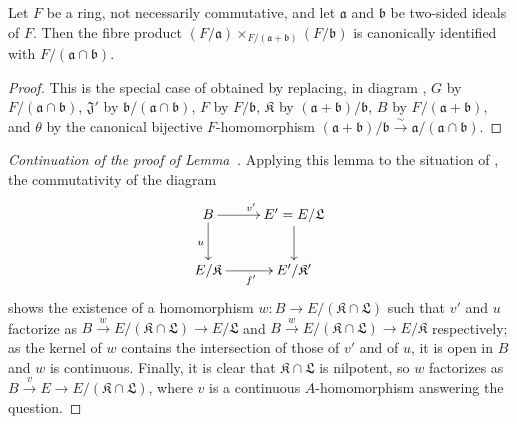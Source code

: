 \begin{lemma}[19.3.10.2]
\label{0.19.3.10.2}
Let $F$ be a ring, not necessarily commutative, and let $\mathfrak{a}$ and $\mathfrak{b}$ be two-sided ideals of $F$.
Then the fibre product $(F/\mathfrak{a})\times_{F/(\mathfrak{a}+\mathfrak{b})}(F/\mathfrak{b})$
is canonically identified with $F/(\mathfrak{a}\cap\mathfrak{b})$.
\end{lemma}

\begin{proof}
This is the special case of  obtained by replacing, in diagram , $G$ by $F/(\mathfrak{a}\cap\mathfrak{b})$, $\mathfrak{J}'$ by $\mathfrak{b}/(\mathfrak{a}\cap\mathfrak{b})$, $F$ by $F/\mathfrak{b}$, $\mathfrak K$ by $(\mathfrak{a}+\mathfrak{b})/\mathfrak{b}$, $B$ by $F/(\mathfrak{a}+\mathfrak{b})$, and $\theta$ by the canonical bijective $F$-homomorphism $(\mathfrak{a}+\mathfrak{b})/\mathfrak{b}\xrightarrow{\sim}\mathfrak{a}/(\mathfrak{a}\cap\mathfrak{b})$.
\end{proof}


\begin{proof}[Continuation of the proof of Lemma~{\rm{}}]
Applying this lemma to the situation of , the commutativity of the diagram
\[
\xymatrix{
  B \ar[r]^{v'} \ar[d]_u & E'=E/\mathfrak{L} \ar[d] \\
  E/\mathfrak K \ar[r]_{f'} & E'/\mathfrak K'
}
\]
shows the existence of a homomorphism $w:B\to E/(\mathfrak K\cap\mathfrak{L})$ such that $v'$ and $u$ factorize as
$B\xrightarrow{w}E/(\mathfrak K\cap\mathfrak{L})\to E/\mathfrak{L}$
and
$B\xrightarrow{w}E/(\mathfrak K\cap\mathfrak{L})\to E/\mathfrak K$
respectively; as the kernel of $w$ contains the intersection of those of $v'$ and of $u$, it is open in $B$ and $w$ is continuous.
Finally, it is clear that $\mathfrak K\cap\mathfrak{L}$ is nilpotent, so $w$ factorizes as $B\xrightarrow{v}E\to E/(\mathfrak K\cap\mathfrak{L})$, where $v$ is a continuous $A$-homomorphism answering the question.
\end{proof}

